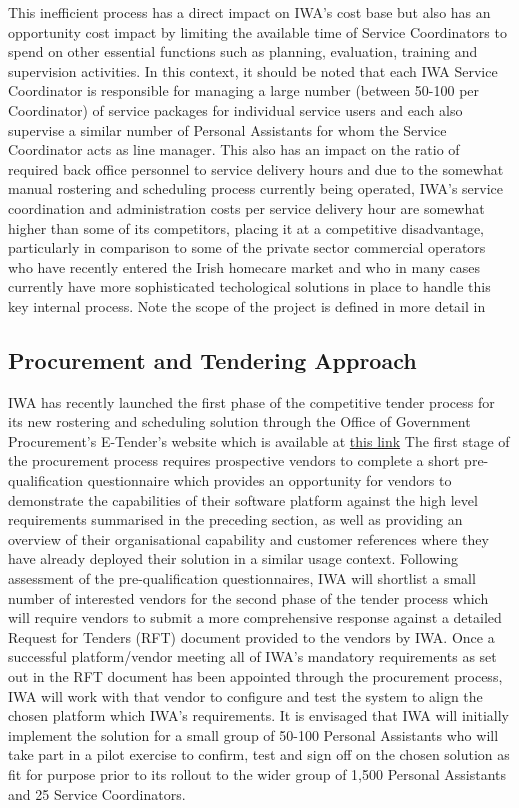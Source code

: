 \documentclass[a4paper,12pt]{article}
\begin{document}
\begin{samepage}
This inefficient process has a direct impact on IWA's cost base but also has an opportunity cost impact by limiting the available time of Service Coordinators to spend on other essential functions such as planning, evaluation, training and supervision activities. In this context, it should be noted that each IWA Service Coordinator is responsible for managing a large number (between 50-100 per Coordinator) of service packages for individual service users and each also supervise a similar number of Personal Assistants for whom the Service Coordinator acts as line manager. This also has an impact on the ratio of required back office personnel to service delivery hours and due to the somewhat manual rostering and scheduling process currently being operated,  IWA's service coordination and administration costs per service delivery hour are somewhat higher than some of its competitors, placing it at a competitive disadvantage, particularly in comparison to some of the private sector commercial operators who have recently entered the Irish homecare market and who in many cases currently have more sophisticated techological solutions in place to handle this key internal process. Note the scope of the project is defined in more detail in 

\subsection {Procurement and Tendering Approach}
IWA has recently launched the first phase of the competitive tender process for its new rostering and scheduling solution through the Office of Government Procurement's E-Tender's website which is available at \href{https://irl.eu-supply.com/app/rfq/publicpurchase_frameset.asp?PID=110399&B=ETENDERS_SIMPLE&PS=1&PP=ctm/Supplier/publictenders}{this link}
The first stage of the procurement process requires prospective vendors to complete a short pre-qualification questionnaire which provides an opportunity for vendors to demonstrate the capabilities of their software platform against the high level requirements summarised in the preceding section, as well as providing an overview of their organisational capability and customer references where they have already deployed their solution in a similar usage context.  
Following assessment of the pre-qualification questionnaires, IWA will shortlist a small number of interested vendors for the second phase of the tender process which will require vendors to submit a more comprehensive response against a detailed Request for Tenders (RFT) document provided to the vendors by IWA. Once a successful platform/vendor meeting all of IWA's mandatory requirements as set out in the RFT document has been appointed through the procurement process, IWA will work with that vendor to configure and test the system to align the chosen platform which IWA's requirements. It is envisaged that IWA will initially implement the solution for a small group of 50-100 Personal Assistants who will take part in a pilot exercise to confirm, test and sign off on the chosen solution as fit for purpose prior to its rollout to the wider group of 1,500 Personal Assistants and 25 Service Coordinators.
\newpage
\begin{samepage}

\end{samepage}
\end{samepage}
\end{document}
